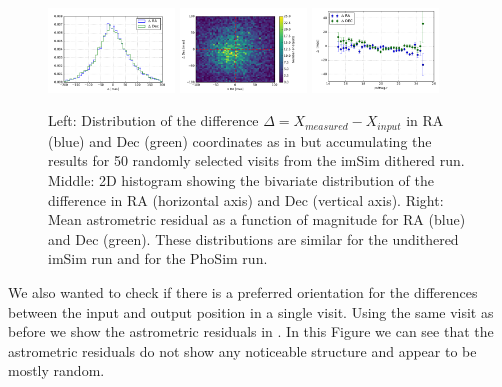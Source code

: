 \documentclass[\docopts]{\docclass}
\begin{document}
\begin{figure}
  \centering
  \includegraphics[width=0.3\textwidth]{astrometry_imsim_dithered_50visits}
  \includegraphics[width=0.3\textwidth]{astrometry_imsim_dithered_50visits_hist2d}
  \includegraphics[width=0.3\textwidth]{astrometry_vs_mag_imsim_50_visits}
  \caption{Left: Distribution of the difference $\Delta=X_{measured}-X_{input}$ in RA (blue) and Dec (green) coordinates as in
   but accumulating the results for 50 randomly selected visits from the imSim dithered run. Middle: 2D histogram
  showing the bivariate distribution of the difference in RA (horizontal axis) and Dec (vertical axis). Right: Mean astrometric residual
  as a function of magnitude for RA (blue) and Dec (green). These distributions are similar for the undithered imSim run and for the PhoSim run.}
  \label{fig:astrometry_b}
\end{figure}

We also wanted to check if there is a preferred orientation for the differences between the input and output position in a single visit. Using
the same visit as before we show the astrometric residuals in . In this Figure we can see that the astrometric
residuals do not show any noticeable structure and appear to be mostly random.
\end{document}
